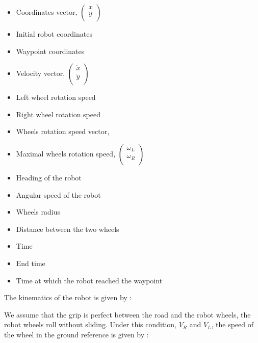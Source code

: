 \documentclass[../main.tex]{subfiles}
\begin{document}
\begin{itemize}
	\item{} Coordinates vector, 
	$\begin{pmatrix}
		x\\
		y\\
	\end{pmatrix}$
	\item{} Initial robot coordinates
	\item{} Waypoint coordinates
	\item{} Velocity vector, 
	$\begin{pmatrix}
		\dot{x}\\
		\dot{y}\\
	\end{pmatrix}$
	\item{} Left wheel rotation speed
	\item{} Right wheel rotation speed
	\item{\makebox[2cm][l]{$\omega$}} Wheels rotation speed vector, 
	\item{} Maximal wheels rotation speed, 
	$\begin{pmatrix}
		\omega_L\\
		\omega_R\\
	\end{pmatrix}$
	\item{\makebox[2cm][l]{$\theta$}} Heading of the robot
	\item{\makebox[2cm][l]{$\dot{\theta}$}} Angular speed of the robot
	\item{} Wheels radius
	\item{} Distance between the two wheels
	\item{} Time
	\item{} End time
	\item{} Time at which the robot reached the waypoint
\end{itemize}

The kinematics of the robot is given by :

We assume that the grip is perfect between the road and the robot wheels, the robot wheels roll without sliding. Under this condition, $V_R$ and $V_L$, the speed of the wheel in the ground reference is given by :
\end{document}
